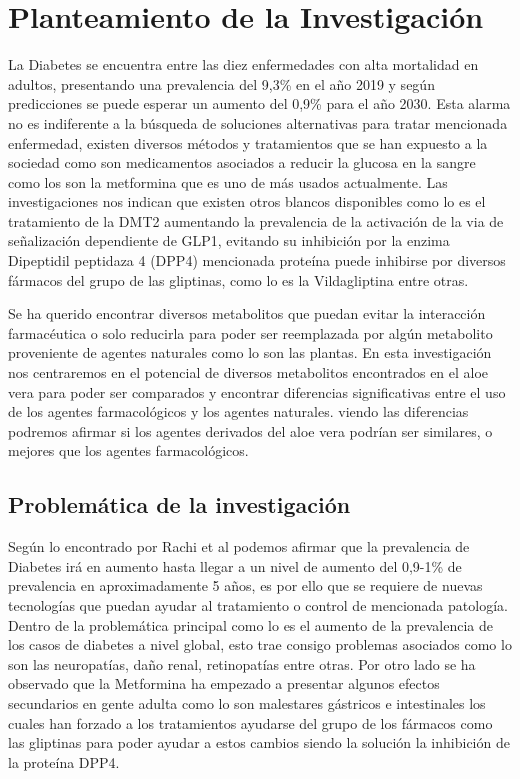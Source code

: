 \chapter{Planteamiento de la Investigación}
\renewcommand{\figurename}{Figura}
La Diabetes se encuentra entre las diez enfermedades con alta mortalidad en adultos, presentando una prevalencia del 9,3\% en el año 2019 y según predicciones se puede esperar un aumento del 0,9\% para el año 2030. %
Esta alarma no es indiferente a la búsqueda de soluciones alternativas para tratar mencionada enfermedad, existen diversos métodos y tratamientos que se han expuesto a la sociedad como son medicamentos asociados a reducir la glucosa en la sangre como los son la metformina que es uno de más usados actualmente.%
Las investigaciones nos indican que existen otros blancos disponibles como lo es el tratamiento de la DMT2 aumentando la prevalencia de la activación de la via de señalización dependiente de GLP1, evitando su inhibición por la enzima Dipeptidil peptidaza 4 (DPP4) mencionada proteína puede inhibirse por diversos fármacos del grupo de las gliptinas, como lo es la Vildagliptina entre otras. %

Se ha querido encontrar diversos metabolitos que puedan evitar la interacción farmacéutica o solo reducirla para poder ser reemplazada por algún metabolito proveniente de agentes naturales como lo son las plantas. %
En esta investigación nos centraremos en el potencial de diversos metabolitos encontrados en el aloe vera para poder ser comparados y encontrar diferencias significativas entre el uso de los agentes farmacológicos y los agentes naturales. viendo las diferencias podremos afirmar si los agentes derivados del aloe vera podrían ser similares, o mejores que los agentes farmacológicos. %

\section{Problemática de la investigación}

Según lo encontrado por Rachi et al podemos afirmar que la prevalencia de Diabetes irá en aumento hasta llegar a un nivel de aumento del 0,9-1\% de prevalencia en aproximadamente 5 años, es por ello que se requiere de nuevas tecnologías que puedan ayudar al tratamiento o control de mencionada patología.
Dentro de la problemática principal como lo es el aumento de la prevalencia de los casos de diabetes a nivel global, esto trae consigo problemas asociados como lo son las neuropatías, daño renal, retinopatías entre otras.%
Por otro lado se ha observado que la Metformina ha empezado a presentar algunos efectos secundarios en gente adulta como lo son malestares gástricos e intestinales los cuales han forzado a los tratamientos ayudarse del grupo de los fármacos como las gliptinas para poder ayudar a estos cambios siendo la solución la inhibición de la proteína DPP4.

